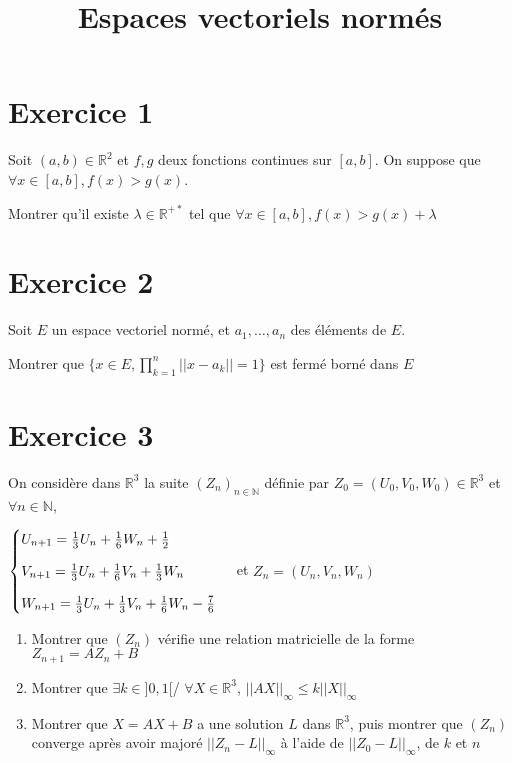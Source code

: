 \documentclass[11pt]{article}
\author{\Name \texttt{\Login}}
\date{}
\title{Espaces vectoriels normés}
\begin{document}
\maketitle

\section*{Exercice 1}

Soit $(a,b)\in\mathbb{R}^2$ et $f,g$ deux fonctions continues sur $[a,b]$. On suppose que $\forall x\in[a,b], f(x)>g(x)$.

Montrer qu'il existe $\lambda\in\mathbb{R^{+*}}$ tel que $\forall x\in[a,b], f(x)>g(x)+\lambda$

\section*{Exercice 2}

Soit $E$ un espace vectoriel normé, et $a_1,\dots,a_n$ des éléments de $E$.

Montrer que $\{x\in E, \prod_{k=1}^n ||x-a_k||=1\}$ est fermé borné dans $E$

\section*{Exercice 3}

On considère dans $\mathbb{R}^3$ la suite $(Z_n)_{n\in\mathbb{N}}$ définie par $Z_0=(U_0,V_0,W_0)\in\mathbb{R}^3$ et $\forall n\in\mathbb{N}$,

$ \begin{cases}
U_{n+1}=\frac{1}{3}U_n+\frac{1}{6}W_n+\frac{1}{2} \vspace{3mm} \\
V_{n+1}=\frac{1}{3}U_n+\frac{1}{6}V_n+\frac{1}{3}W_n \vspace{3mm}\\
W_{n+1}=\frac{1}{3}U_n+\frac{1}{3}V_n+\frac{1}{6}W_n-\frac{7}{6}
\end{cases}$ et $Z_n=(U_n,V_n,W_n)$

\begin{enumerate}
\item Montrer que $(Z_n)$ vérifie une relation matricielle de la forme $Z_{n+1} = AZ_n+B$
\item Montrer que $\exists k\in ]0,1[$/ $\forall X\in \mathbb{R}^3$, $||AX||_{\infty}\leq k||X||_{\infty}$
\item Montrer que $X=AX+B$ a une solution $L$ dans $\mathbb{R}^3$, puis montrer que $(Z_n)$ converge après avoir majoré $||Z_n-L||_{\infty}$ à l'aide de $||Z_0-L||_{\infty}$, de $k$ et $n$
\end{enumerate}
\end{document}
